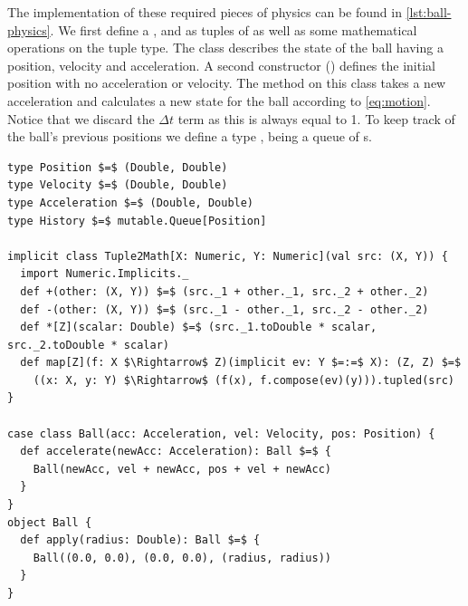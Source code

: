 The implementation of these required pieces of physics can be found in \autoref{lst:ball-physics}. We first define a ,  and  as tuples of  as well as some mathematical operations on the tuple type. The  class describes the state of the ball having a position, velocity and acceleration. A second constructor () defines the initial position with no acceleration or velocity. The method  on this class takes a new acceleration and calculates a new state for the ball according to \autoref{eq:motion}. Notice that we discard the $\Delta t$ term as this is always equal to 1. To keep track of the ball's previous positions we define a type , being a queue of s.

\begin{minipage}{\linewidth}
\begin{lstlisting}[style=ScalaStyle, caption={Ball motion physics}, label={lst:ball-physics}]
type Position $=$ (Double, Double)
type Velocity $=$ (Double, Double)
type Acceleration $=$ (Double, Double)
type History $=$ mutable.Queue[Position]

implicit class Tuple2Math[X: Numeric, Y: Numeric](val src: (X, Y)) {
  import Numeric.Implicits._
  def +(other: (X, Y)) $=$ (src._1 + other._1, src._2 + other._2)
  def -(other: (X, Y)) $=$ (src._1 - other._1, src._2 - other._2)
  def *[Z](scalar: Double) $=$ (src._1.toDouble * scalar, src._2.toDouble * scalar)
  def map[Z](f: X $\Rightarrow$ Z)(implicit ev: Y $=:=$ X): (Z, Z) $=$
    ((x: X, y: Y) $\Rightarrow$ (f(x), f.compose(ev)(y))).tupled(src)
}

case class Ball(acc: Acceleration, vel: Velocity, pos: Position) {
  def accelerate(newAcc: Acceleration): Ball $=$ {
    Ball(newAcc, vel + newAcc, pos + vel + newAcc)
  }
}
object Ball {
  def apply(radius: Double): Ball $=$ {
    Ball((0.0, 0.0), (0.0, 0.0), (radius, radius))
  }
}
\end{lstlisting}
\end{minipage}


